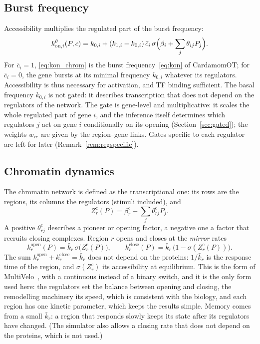 \documentclass[a4paper, 11pt]{article}
\newcommand{\koni}{k_{\mathrm{on},i}^{\theta}}
\newcommand{\kop}{k^{\mathrm{open}}}
\newcommand{\kcl}{k^{\mathrm{close}}}
\newcommand{\thc}{\theta^{\mathrm{c}}}
\newcommand{\bc}{\beta^{\mathrm{c}}}
\newcommand{\cbar}{\bar c}
\theoremstyle{plain}
\theoremstyle{remark}
\begin{document}
\subsection{Burst frequency}

Accessibility multiplies the regulated part of the burst frequency:
\begin{equation}\label{eq:kon_chrom}
\koni(P, c) = k_{0,i} + (k_{1,i} - k_{0,i})\,\cbar_i\,\sigma\Bigl(\beta_i + \sum_j \theta_{ij}P_j\Bigr).
\end{equation}
For $\cbar_i = 1$, \eqref{eq:kon_chrom} is the burst frequency~\eqref{eq:kon} of CardamomOT; for $\cbar_i = 0$, the gene bursts at its minimal frequency $k_{0,i}$ whatever its regulators. Accessibility is thus necessary for activation, and TF binding sufficient. The basal frequency $k_{0,i}$ is not gated: it describes transcription that does not depend on the regulators of the network. The gate is gene-level and multiplicative: it scales the whole regulated part of gene $i$, and the inference itself determines which regulators $j$ act on gene $i$ conditionally on its opening (Section~\ref{sec:gated}); the weights $w_{ir}$ are given by the region--gene links. Gates specific to each regulator are left for later (Remark~\ref{rem:regspecific}).

\subsection{Chromatin dynamics}\label{sec:chromdyn}

The chromatin network is defined as the transcriptional one: its rows are the regions, its columns the regulators (stimuli included), and
\begin{equation}\label{eq:zc}
Z^{\mathrm{c}}_r(P) = \bc_r + \sum_j \thc_{rj}P_j .
\end{equation}
A positive $\thc_{rj}$ describes a pioneer or opening factor, a negative one a factor that recruits closing complexes. Region $r$ opens and closes at the \emph{mirror} rates
\begin{equation}\label{eq:closing}
\kop_r(P) = \bar k_r\,\sigma\bigl(Z^{\mathrm{c}}_r(P)\bigr), \qquad \kcl_r(P) = \bar k_r\,\bigl(1 - \sigma(Z^{\mathrm{c}}_r(P))\bigr).
\end{equation}
The sum $\kop_r + \kcl_r = \bar k_r$ does not depend on the proteins: $1/\bar k_r$ is the response time of the region, and $\sigma(Z^{\mathrm{c}}_r)$ its accessibility at equilibrium. This is the form of MultiVelo~\cite{li2023multivelo}, with a continuous instead of a binary switch, and it is the only form used here: the regulators set the balance between opening and closing, the remodelling machinery its speed, which is consistent with the biology, and each region has one kinetic parameter, which keeps the results simple. Memory comes from a small $\bar k_r$: a region that responds slowly keeps its state after its regulators have changed. (The simulator also allows a closing rate that does not depend on the proteins, which is not used.)
\end{document}
